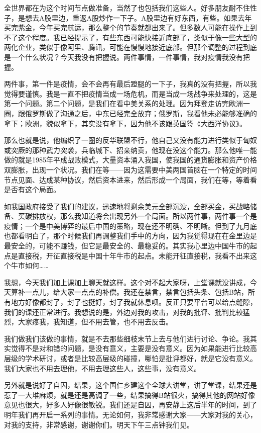 \documentclass[UTF8, 12pt, a4paper]{ctexrep}
\begin{document}
全世界都在为这个时间节点做准备，当然了也包括我们这些人。好多朋友耐不住性子，是想去A股里边，重返A股炒作一下子。A股里边有好东西，有些。如果去年买完紫金，今年买完航运，那么整个的节奏就都出来了。但多数人可能在操作上到不了这个程度。我已经提示了，有些东西可能快接近底部了，类似于像一些大型的两化企业，类似于像阿里、腾讯，可能在慢慢地接近底部。但那个调整的过程到底是一个什么状况？今天我没有把握说。两件事情，一件事情，我对疫情我没有把握。

两件事，第一件是疫情，会不会再有最后蹬腿的一下子，我真的没有把握，所以我觉得要谨慎。我是一直不把疫情当成一场危机，而是当成一场战争来处理的，这是第一个问题。第二个问题，是我们在看中美关系的处理。因为拜登走访完欧洲一圈，跟俄罗斯做了沟通之后，中东已经完全放弃；俄罗斯，我看他未必能够准确的拿下；欧洲，貌似拿下，其实没有拿下，因为他不该跟英国签《大西洋协议》。

那么也就是说，他编织了一圈的反华联盟不行，他自己又没有能力进行类似于匈奴或突厥的那种武力突袭，兵临城下、招亲纳贡，他现在没这个能力。那么他唯一能做的就是1985年平成战败模式，大量资本涌入我国，使我国的通货膨胀和资产价格双膨胀，出现一个状况。我们在等——因为这需要中美两国首脑在一个特定的时间节点见面、达成某种协议，然后资本进来，然后形成一个局面，我们在等，等着看是否有这个局面。

如我国政府接受了我们的建议，迅速地将剩余美元全部沉没，全部买金，买战略储备、买碳排放权，那么我知道将会出现另外一个局面。所以两件事，两件事一个是疫情；一个是中美博弈的最后中国的策略，现在还不明确、不明晰。但到了九月底也都看明白了，那个时候我们再调整我们手中的方向，因为我觉得现在在金里边是最安全的，可能不赚钱，但它是最安全的、最稳妥的。其实我心里边中国牛市的起点是直接税，开征直接税是中国十年牛市的起点。未能开征直接税，我看不出来这个牛市如何……

我想，今天我们加上课加上聊天就这样。这个对不起大家呀，上堂课就没讲成，今天算补一点儿，给大家一点点的补偿。我还在禁言，禁言包括头条、包括B站，所有地方好像都封了，封了也挺好，封了我就休息呗。反正只要平台可以给点缝隙，我们的课还正常进行。我想说的是，外边对我的攻击，对我的批评、批判比较猛烈，大家疼我，我知道，但不用去管，也不用去反击。

我们做我们该做的事情，就是不去那些细枝末节上去与他们进行讨论、争论。我其实觉得不是对和错的问题，是没有意义，主要是没有意义。因为如果能进行比较高层级的学术研讨，或者是比较高层级的碰撞，哪怕是批评都好，就是它没有意义。我们大家也不用去理他，不用去理这些人，这些事，没有意义。

另外就是说好了自囚，结果，这个国仁乡建这个全球大讲堂，讲了堂课，结果还是惹了一大堆麻烦，就是还是高调了一些，结果搞得B站很火，搞得其他的网站好像意见也很大，好多人好像很敏锐。我们还是自囚，再安静上这后半年的时间，到了明年我们再开启一系列的事情。无论如何，我非常感谢大家——大家对我的关心，对我的支持，非常感谢，谢谢你们。明天下午三点钟我们见。
\end{document}
